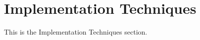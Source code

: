 \documentclass[proposal.tex]{subfiles}
\begin{document}
    
\section{Implementation Techniques}

This is the Implementation Techniques section.
\end{document}
